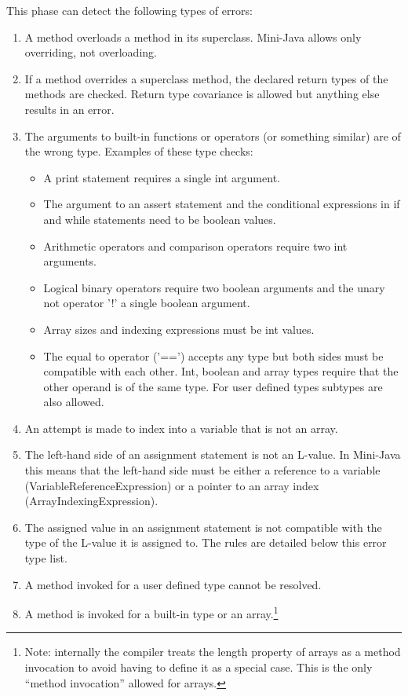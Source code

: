\documentclass[a4paper,11pt]{article}
\begin{document}
This phase can detect the following types of errors:
\begin{enumerate}
\item A method overloads a method in its superclass. Mini-Java allows only overriding, not overloading.
\item If a method overrides a superclass method, the declared return types of the methods are checked. Return type covariance is allowed but anything else results in an error.
\item The arguments to built-in functions or operators (or something similar) are of the wrong type. Examples of these type checks:
\begin{itemize}
\item A print statement requires a single int argument.
\item The argument to an assert statement and the conditional expressions in if and while statements need to be boolean values.
\item Arithmetic operators and comparison operators require two int arguments.
\item Logical binary operators require two boolean arguments and the unary not operator '!' a single boolean argument.
\item Array sizes and indexing expressions must be int values.
\item The equal to operator ('==') accepts any type but both sides must be compatible with each other. Int, boolean and array types require that the other operand is of the same type. For user defined types subtypes are also allowed. %
\end{itemize}
\item An attempt is made to index into a variable that is not an array.
\item The left-hand side of an assignment statement is not an L-value. In Mini-Java this means that the left-hand side must be either a reference to a variable (VariableReferenceExpression) or a pointer to an array index (ArrayIndexingExpression).
\item The assigned value in an assignment statement is not compatible with the type of the L-value it is assigned to. The rules are detailed below this error type list.
\item A method invoked for a user defined type cannot be resolved.
\item A method is invoked for a built-in type or an array.\footnote{Note: internally the compiler treats the length property of arrays as a method invocation to avoid having to define it as a special case. This is the only ``method invocation'' allowed for arrays.}

\end{enumerate}
\end{document}
